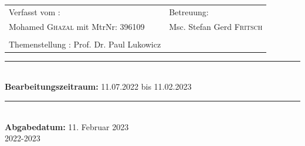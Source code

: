 \begin{titlepage}
\begin{center}
\begin{minipage}{\textwidth}
    	    {\normalfont\bfseries
    	    \begin{tabular}{p{}p{}}
    	        Verfasst vom : &Betreuung:\\
    	        Mohamed \textsc{Ghazal} mit MtrNr: 396109 & Msc. Stefan Gerd \textsc{Fritsch}\\
    	        \\ Themenstellung : Prof. Dr. Paul Lukowicz
    	    \end{tabular}
    	}
    	\end{minipage}
	\rule{.8\textwidth}{1.6pt}\\[.5\baselineskip]
	\textbf{Bearbeitungszeitraum:} 11.07.2022 bis 11.02.2023
	\end{center}
	\rule{\textwidth}{1pt}\\[.5\baselineskip]
	\textbf{Abgabedatum:} 11. Februar 2023\\
	2022-2023
\end{titlepage}
\restoregeometry 
